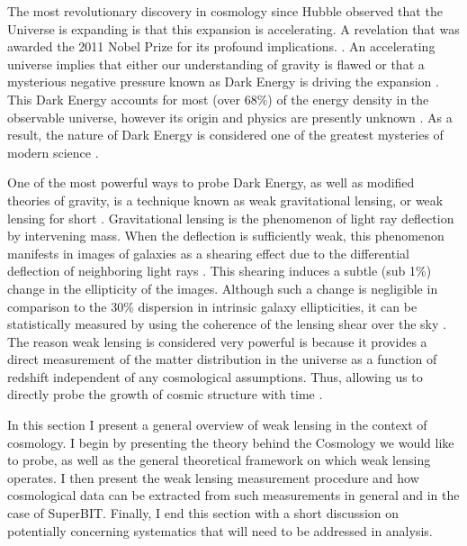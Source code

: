 The most revolutionary discovery in cosmology since 
Hubble observed that the Universe is expanding is that 
this expansion is accelerating. A revelation that was 
awarded the 2011 Nobel Prize for its profound 
implications. \cite{nobel}. An accelerating
universe implies that either our understanding of gravity is flawed 
or that a mysterious negative pressure known as Dark Energy is driving the 
expansion \cite{peebles}.
This Dark Energy accounts for most (over 68\%) of the energy density in the observable universe, 
however its origin and physics are presently unknown \cite{planck}. 
As a result, the nature of Dark Energy is considered one of the 
greatest mysteries of modern science \cite{pathfinder}.  
\par
One of the most powerful ways to probe Dark Energy, as well as modified theories of gravity, is a technique known as weak gravitational lensing, or weak lensing for short \cite{hoekstra,rachel_2018}. Gravitational lensing is the phenomenon of light ray deflection by intervening mass. When the deflection is sufficiently weak, this phenomenon manifests in images of galaxies as a shearing effect due to the differential deflection of neighboring light rays \cite{general_2013,hoekstra}. This shearing induces a subtle (sub 1\%) change in the ellipticity of the images. Although such a change is negligible in comparison to the 30\% dispersion in intrinsic galaxy ellipticities, it can be statistically measured by using the coherence of the lensing shear over the sky \cite{general_2013}. The reason weak lensing is considered very powerful is because it provides a direct measurement of the matter distribution in the universe as a function of redshift independent of any cosmological assumptions. Thus, allowing us to directly probe the growth of cosmic structure with time \cite{hoekstra}. 
\par
In this section I present a general overview of weak lensing in the context of cosmology. I begin by presenting the theory behind the Cosmology we would like to probe, as well as the general theoretical framework on which weak lensing operates. I then present the weak lensing measurement procedure and how cosmological data can be extracted from such measurements in general and in the case of SuperBIT. Finally, I end this section with a short discussion on potentially concerning systematics that will need to be addressed in analysis. 